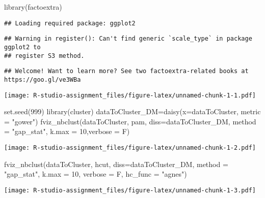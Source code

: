 \documentclass[
]{article}
\newenvironment{Shaded}{\begin{snugshade}}{\end{snugshade}}
\newcommand{\AttributeTok}[1]{\textcolor[rgb]{0.77,0.63,0.00}{#1}}
\newcommand{\DecValTok}[1]{\textcolor[rgb]{0.00,0.00,0.81}{#1}}
\newcommand{\FunctionTok}[1]{\textcolor[rgb]{0.00,0.00,0.00}{#1}}
\newcommand{\NormalTok}[1]{#1}
\newcommand{\OtherTok}[1]{\textcolor[rgb]{0.56,0.35,0.01}{#1}}
\newcommand{\StringTok}[1]{\textcolor[rgb]{0.31,0.60,0.02}{#1}}
\begin{document}
\begin{Shaded}
\begin{Highlighting}[]
\FunctionTok{library}\NormalTok{(factoextra)}
\end{Highlighting}
\end{Shaded}

\begin{verbatim}
## Loading required package: ggplot2
\end{verbatim}

\begin{verbatim}
## Warning in register(): Can't find generic `scale_type` in package ggplot2 to
## register S3 method.
\end{verbatim}

\begin{verbatim}
## Welcome! Want to learn more? See two factoextra-related books at https://goo.gl/ve3WBa
\end{verbatim}

\texttt{[image: R-studio-assignment\_files/figure-latex/unnamed-chunk-1-1.pdf]}

\begin{Shaded}
\begin{Highlighting}[]
\FunctionTok{set.seed}\NormalTok{(}\DecValTok{999}\NormalTok{)}
\FunctionTok{library}\NormalTok{(cluster)}
\NormalTok{dataToCluster\_DM}\OtherTok{=}\FunctionTok{daisy}\NormalTok{(}\AttributeTok{x=}\NormalTok{dataToCluster, }\AttributeTok{metric =} \StringTok{"gower"}\NormalTok{)}
\FunctionTok{fviz\_nbclust}\NormalTok{(dataToCluster, }
\NormalTok{             pam,}
             \AttributeTok{diss=}\NormalTok{dataToCluster\_DM,}
             \AttributeTok{method =} \StringTok{"gap\_stat"}\NormalTok{,}
             \AttributeTok{k.max =} \DecValTok{10}\NormalTok{,}\AttributeTok{verbose =}\NormalTok{ F)}
\end{Highlighting}
\end{Shaded}

\texttt{[image: R-studio-assignment\_files/figure-latex/unnamed-chunk-1-2.pdf]}

\begin{Shaded}
\begin{Highlighting}[]
\FunctionTok{fviz\_nbclust}\NormalTok{(dataToCluster, }
\NormalTok{             hcut,}
             \AttributeTok{diss=}\NormalTok{dataToCluster\_DM,}
             \AttributeTok{method =} \StringTok{"gap\_stat"}\NormalTok{,}
             \AttributeTok{k.max =} \DecValTok{10}\NormalTok{,}
             \AttributeTok{verbose =}\NormalTok{ F,}
             \AttributeTok{hc\_func =} \StringTok{"agnes"}\NormalTok{)}
\end{Highlighting}
\end{Shaded}

\texttt{[image: R-studio-assignment\_files/figure-latex/unnamed-chunk-1-3.pdf]}
\end{document}
